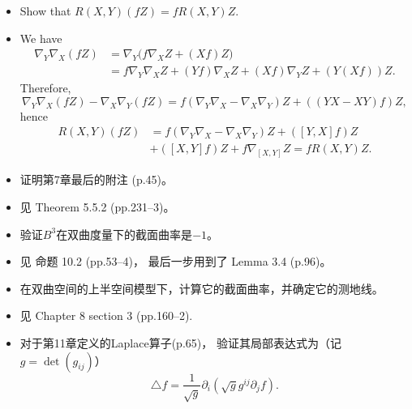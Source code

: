 \begin{itemize}
    \item[2.] Show that $R(X,Y)(fZ)=fR(X,Y)Z$.

    \item[Pf.]
    We have
    \begin{align*}
        \nabla_Y\nabla_X(fZ)&=\nabla_Y\big(f\nabla_XZ+(Xf)Z\big)\\
        &=f\nabla_Y\nabla_XZ+(Yf)\nabla_XZ+(Xf)\nabla_YZ+(Y(Xf))Z.
    \end{align*}
    Therefore,
    \[\nabla_Y\nabla_X(fZ)-\nabla_X\nabla_Y(fZ)
    =f(\nabla_Y\nabla_X-\nabla_X\nabla_Y)Z+((YX-XY)f)Z,\]
    hence
    \begin{align*}
        R(X,Y)(fZ)&=f(\nabla_Y\nabla_X-\nabla_X\nabla_Y)Z+([Y,X]f)Z\\
        &+([X,Y]f)Z+f\nabla_{[X,Y]}Z=fR(X,Y)Z.
    \end{align*}

    \item[3.] 证明\cite{Xin}第7章最后的附注 (p.45)。
    
    \item[Pf.] 见\cite{Jo} Theorem 5.5.2 (pp.231--3)。

    \item[4.] 验证$B^3$在双曲度量下的截面曲率是$-1$。

    \item[Pf.] 见\cite{Xin} 命题 10.2 (pp.53--4)，
    最后一步用到了\cite{dC} Lemma 3.4 (p.96)。
    
    \item[5.] 在双曲空间的上半空间模型下，计算它的截面曲率，并确定它的测地线。

    \item[Pf.]
    见\cite{dC} Chapter 8 section 3 (pp.160--2).

    \item[6.] 对于\cite{Xin}第11章定义的Laplace算子(p.65)，
    验证其局部表达式为（记$g=\det(g_{ij})$）
    \[\triangle f=\frac{1}{\sqrt{g}}\partial_i(\sqrt{g}g^{ij}\partial_jf).\]


\end{itemize}
